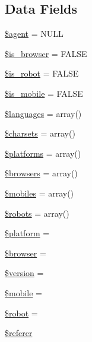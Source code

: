 \subsection*{Data Fields}
\begin{DoxyCompactItemize}
\item 
\mbox{\hyperlink{class_c_i___user__agent_a0606e5b321c8c85527efdd1c17a9a569}{\$agent}} = N\+U\+LL
\item 
\mbox{\hyperlink{class_c_i___user__agent_af9608f790bc03edf6c152d11cd879e04}{\$is\+\_\+browser}} = F\+A\+L\+SE
\item 
\mbox{\hyperlink{class_c_i___user__agent_a4b3d4b92832b15f313661bc9af0323fa}{\$is\+\_\+robot}} = F\+A\+L\+SE
\item 
\mbox{\hyperlink{class_c_i___user__agent_a15f8c9cdaac57894151997b80f38224d}{\$is\+\_\+mobile}} = F\+A\+L\+SE
\item 
\mbox{\hyperlink{class_c_i___user__agent_a8856d0a49881ef8e0a6d205d37d4a7af}{\$languages}} = array()
\item 
\mbox{\hyperlink{class_c_i___user__agent_ae269ee30c94deb9b791c1ae5489b88f3}{\$charsets}} = array()
\item 
\mbox{\hyperlink{class_c_i___user__agent_a1c1a0a860242698ee6b3f4ef7d6eb343}{\$platforms}} = array()
\item 
\mbox{\hyperlink{class_c_i___user__agent_a81edf933083b5ac5b380385f59074a7d}{\$browsers}} = array()
\item 
\mbox{\hyperlink{class_c_i___user__agent_a6928dde5aa0be443766d5b2376de908a}{\$mobiles}} = array()
\item 
\mbox{\hyperlink{class_c_i___user__agent_a5752e2a66d1c03bc34666492746037ab}{\$robots}} = array()
\item 
\mbox{\hyperlink{class_c_i___user__agent_a9cb2b1a2275f65f39415f0366139fb1c}{\$platform}} = \textquotesingle{}\textquotesingle{}
\item 
\mbox{\hyperlink{class_c_i___user__agent_ada6112ba48917a0c8cc154ed90908b28}{\$browser}} = \textquotesingle{}\textquotesingle{}
\item 
\mbox{\hyperlink{class_c_i___user__agent_a17c8948c68aa44fa9961ae169b6a8961}{\$version}} = \textquotesingle{}\textquotesingle{}
\item 
\mbox{\hyperlink{class_c_i___user__agent_a4144d0c9c54f204811328b221f06fc3d}{\$mobile}} = \textquotesingle{}\textquotesingle{}
\item 
\mbox{\hyperlink{class_c_i___user__agent_aaf86508e45876d0081cadac4cb8a8808}{\$robot}} = \textquotesingle{}\textquotesingle{}
\item 
\mbox{\hyperlink{class_c_i___user__agent_a872d93ddbbb879ab5c0eb29261a520a4}{\$referer}}
\end{DoxyCompactItemize}
